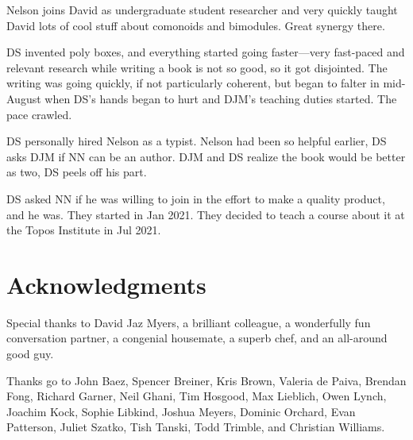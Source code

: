 \documentclass[Book-Poly]{subfiles}
\begin{document}
Nelson joins David as undergraduate student researcher and very quickly taught David lots of cool stuff about comonoids and bimodules. Great synergy there. 

DS invented poly boxes, and everything started going faster---very fast-paced and relevant research while writing a book is not so good, so it got disjointed. The writing was going quickly, if not particularly coherent, but began to falter in mid-August when DS's hands began to hurt and DJM's teaching duties started. The pace crawled. 

DS personally hired Nelson as a typist. Nelson had been so helpful earlier, DS asks DJM if NN can be an author. DJM and DS realize the book would be better as two, DS peels off his part. 

DS asked NN if he was willing to join in the effort to make a quality product, and he was. They started in Jan 2021. They decided to teach a course about it at the Topos Institute in Jul 2021.

\section*{Acknowledgments}

Special thanks to David Jaz Myers, a brilliant colleague, a wonderfully fun conversation partner, a congenial housemate, a superb chef, and an all-around good guy. 

Thanks go to John Baez, Spencer Breiner, Kris Brown, Valeria de Paiva, Brendan Fong, Richard Garner, Neil Ghani, Tim Hosgood, Max Lieblich, Owen Lynch, Joachim Kock, Sophie Libkind, Joshua Meyers, Dominic Orchard, Evan Patterson, Juliet Szatko, Tish Tanski, Todd Trimble, and Christian Williams.
\end{document}
